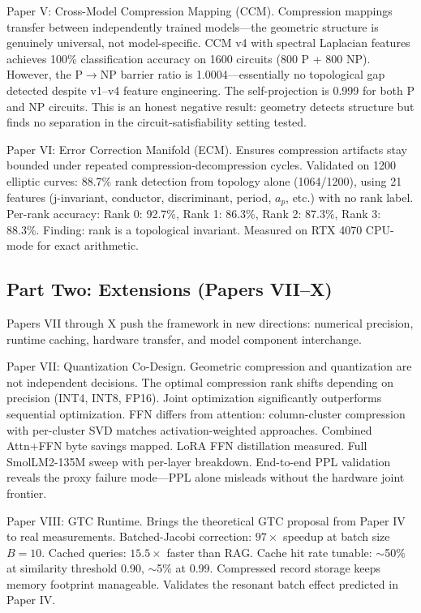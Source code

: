 \documentclass[11pt]{article}
\begin{document}
Paper V: Cross-Model Compression Mapping (CCM). Compression mappings transfer between independently trained models---the geometric structure is genuinely universal, not model-specific. CCM v4 with spectral Laplacian features achieves 100\% classification accuracy on 1600 circuits (800 P + 800 NP). However, the P$\rightarrow$NP barrier ratio is 1.0004---essentially no topological gap detected despite v1--v4 feature engineering. The self-projection is 0.999 for both P and NP circuits. This is an honest negative result: geometry detects structure but finds no separation in the circuit-satisfiability setting tested.

Paper VI: Error Correction Manifold (ECM). Ensures compression artifacts stay bounded under repeated compression-decompression cycles. Validated on 1200 elliptic curves: 88.7\% rank detection from topology alone (1064/1200), using 21 features (j-invariant, conductor, discriminant, period, $a_p$, etc.) with no rank label. Per-rank accuracy: Rank 0: 92.7\%, Rank 1: 86.3\%, Rank 2: 87.3\%, Rank 3: 88.3\%. Finding: rank is a topological invariant. Measured on RTX 4070 CPU-mode for exact arithmetic.

\subsection*{Part Two: Extensions (Papers VII--X)}

Papers VII through X push the framework in new directions: numerical precision, runtime caching, hardware transfer, and model component interchange.

Paper VII: Quantization Co-Design. Geometric compression and quantization are not independent decisions. The optimal compression rank shifts depending on precision (INT4, INT8, FP16). Joint optimization significantly outperforms sequential optimization. FFN differs from attention: column-cluster compression with per-cluster SVD matches activation-weighted approaches. Combined Attn+FFN byte savings mapped. LoRA FFN distillation measured. Full SmolLM2-135M sweep with per-layer breakdown. End-to-end PPL validation reveals the proxy failure mode---PPL alone misleads without the hardware joint frontier.

Paper VIII: GTC Runtime. Brings the theoretical GTC proposal from Paper IV to real measurements. Batched-Jacobi correction: $97\times$ speedup at batch size $B = 10$. Cached queries: $15.5\times$ faster than RAG. Cache hit rate tunable: $\sim$50\% at similarity threshold 0.90, $\sim$5\% at 0.99. Compressed record storage keeps memory footprint manageable. Validates the resonant batch effect predicted in Paper IV.
\end{document}
